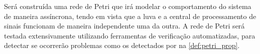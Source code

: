 Será construída uma rede de Petri que irá modelar o comportamento do sistema de maneira assíncrona, tendo em vista que a luva e a central de processamento de sinais funcionam de maneira independente uma da outra. A rede de Petri será testada extensivamente utilizando ferramentas de verificação automatizadas, para detectar se ocorrerão problemas como os detectados por  na \autoref{def:petri_prop}.


